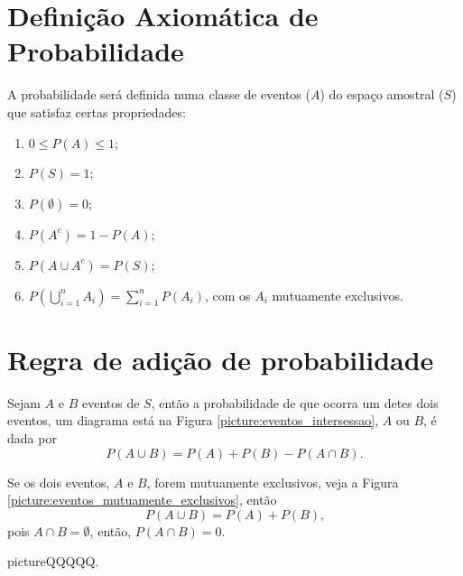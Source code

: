 \documentclass[11pt,fleqn]{book}
\numberwithin{mpicture}{chapter}
\numberwithin{mtable}{chapter}
\numberwithin{mframe}{chapter}
\begin{document}
\section{Definição Axiomática de Probabilidade}

A probabilidade será definida numa classe de eventos ($A$) do espaço amostral ($S$) que satisfaz certas propriedades:
\begin{enumerate}
	\item $0\leqslant P(A)\leqslant 1$;
	\item $P(S)=1$;
	\item $P(\emptyset)=0$;
	\item $P(A^c)=1-P(A)$;
	\item $P(A\cup A^c)=P(S)$;
	\item $P\left ( \displaystyle \bigcup_{i=1}^{n} A_i \right ) = \displaystyle\sum_{i=1}^{n}P(A_i)$, com os $A_i$ mutuamente exclusivos.
\end{enumerate}

\section{Regra de adição de probabilidade}

Sejam $A$ e $B$ eventos de $S$, então a probabilidade de que ocorra um detes dois eventos, um diagrama está na Figura \ref{picture:eventos_intersessao}, $A$ ou $B$, é dada por
\begin{equation}
	P(A\cup B)=P(A)+P(B)-P(A\cap B)\text{.}
\end{equation}

\begin{remark}
	Se os dois eventos, $A$ e $B$, forem mutuamente exclusivos, veja a Figura \ref{picture:eventos_mutuamente_exclusivos}, então
	\begin{equation}
		P(A\cup B)=P(A)+P(B)\text{,}
	\end{equation}
	pois $A\cap B=\emptyset$, então, $P(A\cap B)=0$.
\end{remark}

\begin{sidepicture}{5cm}{picture}{QQQQQ.}
	\label{picture:eventos_intersessao}
\end{sidepicture}
\end{document}
